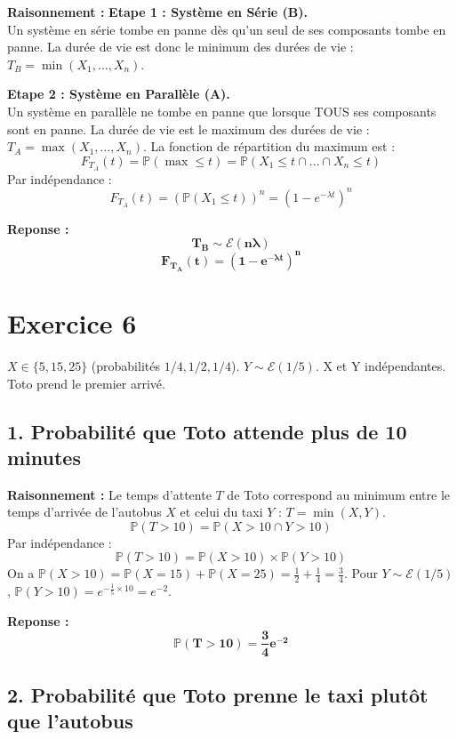 \documentclass[11pt,a4paper]{article}
\begin{document}
\textbf{Raisonnement :}
\textbf{Etape 1 : Système en Série (B).}\\
Un système en série tombe en panne dès qu'un seul de ses composants tombe en panne. La durée de vie est donc le minimum des durées de vie : $T_B = \min(X_1, \dots, X_n)$.

\textbf{Etape 2 : Système en Parallèle (A).}\\
Un système en parallèle ne tombe en panne que lorsque TOUS ses composants sont en panne. La durée de vie est le maximum des durées de vie : $T_A = \max(X_1, \dots, X_n)$.
La fonction de répartition du maximum est :
$$ F_{T_A}(t) = \mathbb{P}(\max \le t) = \mathbb{P}(X_1 \le t \cap \dots \cap X_n \le t) $$
Par indépendance :
$$ F_{T_A}(t) = (\mathbb{P}(X_1 \le t))^n = (1 - e^{-\lambda t})^n $$

\textbf{Reponse :}
$$ \mathbf{T_B \sim \mathcal{E}(n\lambda)} $$
$$ \mathbf{F_{T_A}(t) = (1 - e^{-\lambda t})^n} $$

\hrulefill

\section*{Exercice 6}

$X \in \{5, 15, 25\}$ (probabilités $1/4, 1/2, 1/4$). $Y \sim \mathcal{E}(1/5)$. X et Y indépendantes. Toto prend le premier arrivé.

\subsection*{1. Probabilité que Toto attende plus de 10 minutes}

\textbf{Raisonnement :} 
Le temps d'attente $T$ de Toto correspond au minimum entre le temps d'arrivée de l'autobus $X$ et celui du taxi $Y$ : $T = \min(X, Y)$.
$$ \mathbb{P}(T > 10) = \mathbb{P}(X > 10 \cap Y > 10) $$
Par indépendance :
$$ \mathbb{P}(T > 10) = \mathbb{P}(X > 10) \times \mathbb{P}(Y > 10) $$
On a $\mathbb{P}(X > 10) = \mathbb{P}(X=15) + \mathbb{P}(X=25) = \frac{1}{2} + \frac{1}{4} = \frac{3}{4}$.
Pour $Y \sim \mathcal{E}(1/5)$, $\mathbb{P}(Y > 10) = e^{-\frac{1}{5} \times 10} = e^{-2}$.

\textbf{Reponse :}
$$ \mathbf{\mathbb{P}(T > 10) = \frac{3}{4} e^{-2}} $$

\subsection*{2. Probabilité que Toto prenne le taxi plutôt que l'autobus}
\end{document}
